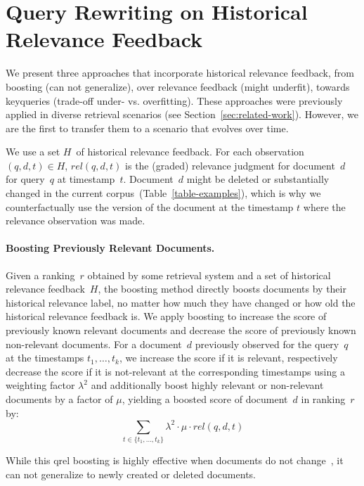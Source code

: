 \section{Query Rewriting on Historical Relevance Feedback}

We present three approaches that incorporate historical relevance feedback, from \Ni boosting (can not generalize), over \Nii relevance feedback (might underfit), towards \Niii keyqueries (trade-off under- vs. overfitting). These approaches were previously applied in diverse retrieval scenarios (see Section~\ref{sec:related-work}). However, we are the first to transfer them to a scenario that evolves over time.

We use a set $H$~of historical relevance feedback. For each observation $(q, d, t) \in H$, $rel(q, d, t)$ is the (graded) relevance judgment for document~$d$ for query~$q$ at timestamp~$t$. Document~$d$ might be deleted or substantially changed in the current corpus~(Table~\ref{table-examples}), which is why we counterfactually use the version of the document at the timestamp $t$ where the relevance observation was made.

\paragraph{Boosting Previously Relevant Documents.} Given a ranking~$r$ obtained by some retrieval system and a set of historical relevance feedback~$H$, the boosting method directly boosts documents by their historical relevance label, no matter how much they have changed or how old the historical relevance feedback is. We apply boosting to increase the score of previously known relevant documents and decrease the score of previously known non-relevant documents. For a document~$d$ previously observed for the query~$q$ at the timestamps $t_{1}, \ldots, t_{k}$, we increase the score if it is relevant, respectively decrease the score if it is not-relevant at the corresponding timestamps using a weighting factor $\lambda^2$ and additionally boost highly relevant or non-relevant documents by a factor of $\mu$, yielding a boosted score of document~$d$ in ranking~$r$ by:
\begin{equation}
\sum\limits_{t \in \{t_{1}, \ldots, t_{k}\}} \lambda^2 \cdot \mu \cdot rel(q,d,t)
\end{equation}

While this qrel boosting is highly effective when documents do not change~\cite{alkhalifa:2024,keller:2024b}, it can not generalize to newly created or deleted documents.


